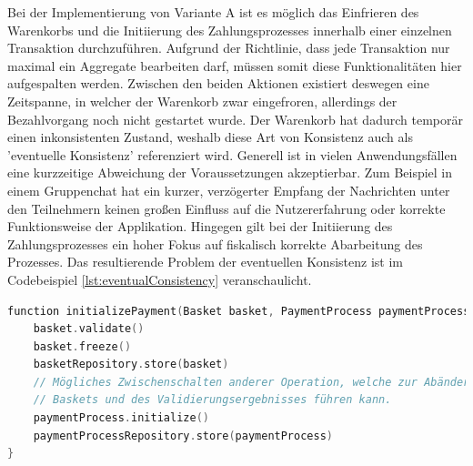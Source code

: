 Bei der Implementierung von Variante A ist es möglich das Einfrieren des Warenkorbs und die Initiierung des Zahlungsprozesses innerhalb einer einzelnen Transaktion durchzuführen. Aufgrund der Richtlinie, dass jede Transaktion nur maximal ein Aggregate bearbeiten darf, müssen somit diese Funktionalitäten hier aufgespalten werden. Zwischen den beiden Aktionen existiert deswegen eine Zeitspanne, in welcher der Warenkorb zwar eingefroren, allerdings der Bezahlvorgang noch nicht gestartet wurde. Der Warenkorb hat dadurch temporär einen inkonsistenten Zustand, weshalb diese Art von Konsistenz auch als 'eventuelle Konsistenz' referenziert wird. Generell ist in vielen Anwendungsfällen eine kurzzeitige Abweichung der Voraussetzungen akzeptierbar. Zum Beispiel in einem Gruppenchat hat ein kurzer, verzögerter Empfang der Nachrichten unter den Teilnehmern keinen großen Einfluss auf die Nutzererfahrung oder korrekte Funktionsweise der Applikation. Hingegen gilt bei der Initiierung des Zahlungsprozesses ein hoher Fokus auf fiskalisch korrekte Abarbeitung des Prozesses. Das resultierende Problem der eventuellen Konsistenz ist im Codebeispiel \ref{lst:eventualConsistency} veranschaulicht.

\begin{minipage}{\linewidth} %
	\begin{lstlisting}[caption={Getrennte Transaktionen für die Initiierung des Bezahlvorgangs}, label={lst:eventualConsistency}, language=Kotlin]
function initializePayment(Basket basket, PaymentProcess paymentProcess) {
	basket.validate()
	basket.freeze()
	basketRepository.store(basket)
	// Mögliches Zwischenschalten anderer Operation, welche zur Abänderung des
	// Baskets und des Validierungsergebnisses führen kann.
	paymentProcess.initialize()
	paymentProcessRepository.store(paymentProcess)
}
	\end{lstlisting}
\end{minipage}

